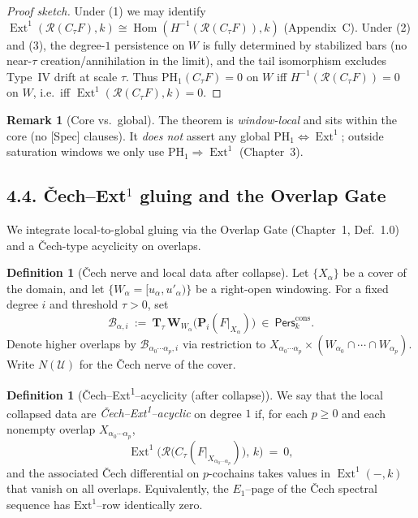 \documentclass[11pt]{article}
\numberwithin{equation}{section}
\theoremstyle{plain}
\theoremstyle{definition}
\theoremstyle{remark}
\DeclareMathOperator{\Ext}{Ext}
\DeclareMathOperator{\Hom}{Hom}
\newcommand{\Pers}{\mathsf{Pers}}
\theoremstyle{plain}
\theoremstyle{definition}
\numberwithin{equation}{section}
\theoremstyle{definition}
\newtheorem{definition}[theorem]{Definition}
\newtheorem{remark}[theorem]{Remark}
\numberwithin{equation}{section}
\theoremstyle{plain}
\theoremstyle{definition}
\theoremstyle{remark}
\newcommand{\Crop}{\mathbf{W}}
\begin{document}
\begin{proof}[Proof sketch]
Under (1) we may identify $\Ext^1(\mathcal{R}(C_\tau F),k)\cong \Hom(H^{-1}(\mathcal{R}(C_\tau F)),k)$ (Appendix~C). Under (2) and (3), the degree-$1$ persistence on $W$ is fully determined by stabilized bars (no near-$\tau$ creation/annihilation in the limit), and the tail isomorphism excludes Type~IV drift at scale $\tau$. Thus $\mathrm{PH}_1(C_\tau F)=0$ on $W$ iff $H^{-1}(\mathcal{R}(C_\tau F))=0$ on $W$, i.e.\ iff $\Ext^1(\mathcal{R}(C_\tau F),k)=0$.
\end{proof}

\begin{remark}[Core vs.\ global]
The theorem is \emph{window-local} and sits within the core (no [Spec] clauses). It \emph{does not} assert any global $\mathrm{PH}_1\Leftrightarrow \Ext^1$; outside saturation windows we only use $\mathrm{PH}_1\Rightarrow \Ext^1$ (Chapter~3).
\end{remark}

\subsection*{4.4. Čech–Ext\texorpdfstring{$^1$}{1} gluing and the Overlap Gate}
We integrate local-to-global gluing via the Overlap Gate (Chapter~1, Def.~1.0) and a Čech-type acyclicity on overlaps.

\begin{definition}[Čech nerve and local data after collapse]\label{def:cech}
Let $\{X_\alpha\}$ be a cover of the domain, and let $\{W_\alpha=[u_\alpha,u'_\alpha)\}$ be a right-open windowing. For a fixed degree $i$ and threshold $\tau>0$, set
\[
\mathcal{B}_{\alpha,i}\ :=\ \mathbf{T}_\tau\,\Crop_{W_\alpha}\big(\mathbf{P}_i(F|_{X_\alpha})\big)\ \in\ \Pers^{\mathrm{cons}}_k.
\]
Denote higher overlaps by $\mathcal{B}_{\alpha_0\cdots\alpha_p,i}$ via restriction to $X_{\alpha_0\cdots\alpha_p}\times (W_{\alpha_0}\cap\cdots\cap W_{\alpha_p})$. Write $N(\mathcal{U})$ for the Čech nerve of the cover.
\end{definition}

\begin{definition}[Čech–Ext\textsuperscript{1}–acyclicity (after collapse)]\label{def:cech-acyclic}
We say that the local collapsed data are \emph{Čech–Ext\textsuperscript{1}–acyclic} on degree $1$ if, for each $p\ge 0$ and each nonempty overlap $X_{\alpha_0\cdots\alpha_p}$,
\[
\Ext^1\!\Big(\mathcal{R}\!\big(C_\tau (F|_{X_{\alpha_0\cdots\alpha_p}})\big),\,k\Big)\ =\ 0,
\]
and the associated Čech differential on $p$-cochains takes values in $\Ext^1(-,k)$ that vanish on all overlaps. Equivalently, the $E_1$–page of the Čech spectral sequence has $\mathrm{Ext}^1$–row identically zero.
\end{definition}
\end{document}
